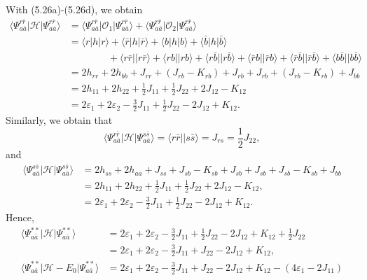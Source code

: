 \documentclass[a4paper]{book}
\newcounter{solution}[chapter]
\begin{document}
\begin{solution}
	With (5.26a)-(5.26d), we obtain
	\begin{align*}
		\langle \Psi^{r \bar{r}}_{a \bar{a}} | \mathscr{H} | \Psi^{r \bar{r}}_{a \bar{a}} \rangle &= \langle \Psi^{r \bar{r}}_{a \bar{a}} | \mathscr{O}_1 | \Psi^{r \bar{r}}_{a \bar{a}} \rangle + \langle \Psi^{r \bar{r}}_{a \bar{a}} | \mathscr{O}_2 | \Psi^{r \bar{r}}_{a \bar{a}} \rangle	\\
		&= \langle r | h | r \rangle + \langle \bar{r} | h | \bar{r} \rangle + \langle b | h | b \rangle + \langle \bar{b} | h | \bar{b} \rangle \\
		&\hspace{4em} + \langle r \bar{r} || r \bar{r} \rangle + \langle rb || rb \rangle + \langle r \bar{b} || r \bar{b} \rangle + \langle \bar{r} b || \bar{r} b \rangle + \langle \bar{r} \bar{b} || \bar{r} \bar{b} \rangle + \langle b \bar{b} || b \bar{b} \rangle \\
		&= 2h_{rr} + 2h_{bb} + J_{rr} + \left( J_{rb} - K_{rb} \right) + J_{rb} + J_{rb} + \left( J_{rb} - K_{rb} \right) + J_{bb} \\
		&= 2h_{11} + 2h_{22} + \frac{1}{2} J_{11} + \frac{1}{2} J_{22} + 2 J_{12} - K_{12} \\
		&= 2\varepsilon_1 + 2\varepsilon_2 - \frac{3}{2} J_{11} + \frac{1}{2} J_{22} - 2J_{12} + K_{12}.
	\end{align*}		
	Similarly, we obtain that
	\[
		\langle \Psi^{r \bar{r}}_{a \bar{a}} | \mathscr{H} | \Psi^{s \bar{s}}_{a \bar{a}} \rangle = \langle r \bar{r} || s \bar{s} \rangle = J_{rs} = \frac{1}{2} J_{22},
	\]
	and
	\begin{align*}
		\langle \Psi^{s \bar{s}}_{a \bar{a}} | \mathscr{H} | \Psi^{s \bar{s}}_{a \bar{a}} \rangle &= 2h_{ss} + 2h_{aa} + J_{ss} + J_{sb} - K_{sb} + J_{sb} + J_{sb} + J_{sb} - K_{sb} + J_{bb} \\
		&= 2h_{11} + 2h_{22} + \frac{1}{2} J_{11} + \frac{1}{2} J_{22} + 2J_{12} - K_{12}, \\
		&= 2\varepsilon_1 + 2\varepsilon_2 - \frac{3}{2} J_{11} + \frac{1}{2} J_{22} - 2J_{12} + K_{12}.
	\end{align*}
	Hence,
	\begin{align*}
		\langle \Psi^{**}_{a \bar{a}} | \mathscr{H} | \Psi^{**}_{a \bar{a}} \rangle &= 2\varepsilon_1 + 2\varepsilon_2 - \frac{3}{2} J_{11} + \frac{1}{2} J_{22} - 2J_{12} + K_{12} + \frac{1}{2} J_{22} \\
		&= 2\varepsilon_1 + 2\varepsilon_2 - \frac{3}{2} J_{11} + J_{22} - 2J_{12} + K_{12}, \\
		\langle \Psi^{**}_{a \bar{a}} | \mathscr{H} - E_0 | \Psi^{**}_{a \bar{a}} \rangle &= 2\varepsilon_1 + 2\varepsilon_2 - \frac{3}{2} J_{11} + J_{22} - 2J_{12} + K_{12} - (4\varepsilon_1 - 2J_{11} ) \\

\end{align*}
\end{solution}
\end{document}
